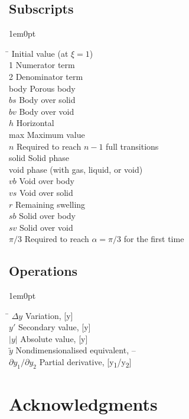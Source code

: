 \documentclass[11pt]{article}
\newcommand{\tSub}[1]{\textsubscript{#1}}
\newcommand{\piov}[1]{\pi/#1}
\newenvironment{customnomenclature}
{\begin{adjustwidth}{1em}{0pt}
		\begin{tabbing}
			\hspace{50pt}\=\kill}
		{	\end{tabbing} 
\end{adjustwidth}}
\begin{document}
\pagebreak

\subsection{Subscripts}
\begin{customnomenclature}
	0 \> Initial value (at $\xi = 1$) \\
	1 \> Numerator term \\
	2 \> Denominator term \\
	body \> Porous body \\
	$bs$ \> Body over solid \\
	$bv$ \> Body over void \\
	$h$ \> Horizontal \\
	max \> Maximum value \\
	$n$ \> Required to reach $n - 1$ full transitions \\
	solid \> Solid phase \\
	void \>  phase (with gas, liquid, or void) \\
	$vb$ \> Void over body \\
	$vs$ \> Void over solid \\
	$r$ \> Remaining swelling \\
	$sb$ \> Solid over body \\
	$sv$ \> Solid over void \\
	$\piov{3}$ \> Required to reach $\alpha = \piov{3}$ for the first time \\
\end{customnomenclature}

\subsection{Operations}
\begin{customnomenclature}
	$\Delta y$ \> Variation, [y] \\
	$y'$ \> Secondary value, [y] \\
	$|y|$ \> Absolute value, [y] \\
	$\widetilde{y}$ \> Nondimensionalised equivalent, – \\
	$\partial y_1 / \partial y_2$ \> Partial derivative, [y\tSub{1}/y\tSub{2}] \\
\end{customnomenclature}

\section*{Acknowledgments}
\end{document}
